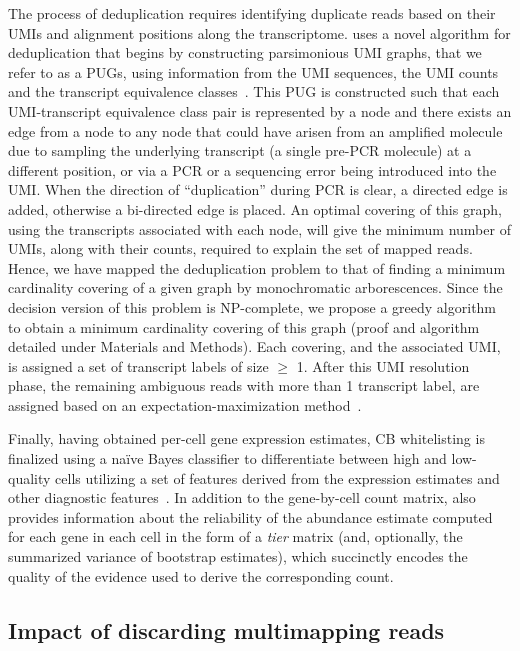 The process of deduplication requires identifying duplicate reads based on their UMIs and alignment positions along the transcriptome. \Alevin uses a novel algorithm for deduplication that begins by constructing parsimonious UMI graphs, that we refer to as a PUGs, using information from the UMI sequences, the UMI counts and the transcript equivalence classes~\citep{mmseq}. This PUG is constructed such that each UMI-transcript equivalence class pair is represented by a node and there exists an edge from a node to any node that could have arisen from an amplified molecule due to sampling the underlying transcript (a single pre-PCR molecule) at a different position, or via a PCR or a sequencing error being introduced into the UMI.  When the direction of ``duplication'' during PCR is clear, a directed edge is added, otherwise a bi-directed edge is placed. An optimal covering of this graph, using the transcripts associated with each node, will give the minimum number of UMIs, along with their counts, required to explain the set of mapped reads. Hence, we have mapped the deduplication problem to that of finding a minimum cardinality covering of a given graph by monochromatic arborescences. Since the decision version of this problem is NP-complete, we propose a greedy algorithm to obtain a minimum cardinality covering of this graph (proof and algorithm detailed under Materials and Methods). Each covering, and the associated UMI, is assigned a set of transcript labels of size $\geq$ 1. After this UMI resolution phase, the remaining ambiguous reads with more than 1 transcript label, are assigned based on an expectation-maximization method~\citep{salmon}. 

Finally, having obtained per-cell gene expression estimates, CB whitelisting is finalized using a na\"ive Bayes classifier to differentiate between high and low-quality cells utilizing a set of features derived from the expression estimates and other diagnostic features~\citep{dropest}. In addition to the gene-by-cell count matrix, \alevin also provides information about the reliability of the abundance estimate computed for each gene in each cell in the form of a \emph{tier} matrix (and, optionally, the summarized variance of bootstrap estimates), which succinctly encodes the quality of the evidence used to derive the corresponding count.

\subsection{Impact of discarding multimapping reads}

